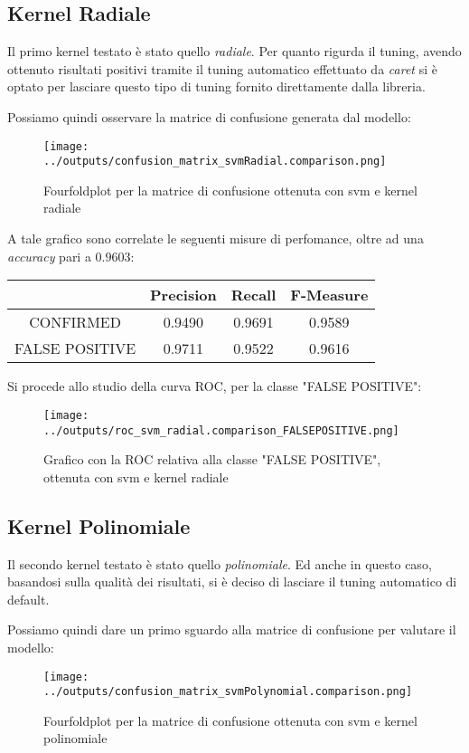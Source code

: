 \subsection{Kernel Radiale}
Il primo kernel testato è stato quello \textit{radiale}.
Per quanto rigurda il tuning, avendo ottenuto risultati positivi tramite il tuning automatico
effettuato da \textit{caret} si è optato per lasciare questo tipo di tuning fornito 
direttamente dalla libreria.

Possiamo quindi osservare la matrice di confusione generata dal modello:
\begin{figure}[H]
    \centering
    \texttt{[image: ../outputs/confusion\_matrix\_svmRadial.comparison.png]}
    \caption{Fourfoldplot per la matrice di confusione ottenuta con svm e kernel radiale}
\end{figure}
A tale grafico sono correlate le seguenti misure di perfomance, oltre ad una 
\textit{accuracy} pari a $0.9603$:
\begin{center}
    \begin{tabular}{| c | c c c |} 
    \hline
    & Precision & Recall & F-Measure \\ [0.5ex] 
    \hline\hline
    CONFIRMED & 0.9490 & 0.9691 & 0.9589 \\ 
    \hline
    FALSE POSITIVE & 0.9711 & 0.9522 & 0.9616 \\ 
    \hline
    \end{tabular}
\end{center}
Si procede allo studio della curva ROC, per la classe "FALSE POSITIVE":
\begin{figure}[H]
    \centering
    \texttt{[image: ../outputs/roc\_svm\_radial.comparison\_FALSEPOSITIVE.png]}
    \caption{Grafico con la ROC relativa alla classe "FALSE POSITIVE", ottenuta con svm e kernel radiale}
\end{figure}
\subsection{Kernel Polinomiale}
Il secondo kernel testato è stato quello \textit{polinomiale}.
Ed anche in questo caso, basandosi sulla qualità dei risultati, si è deciso di
lasciare il tuning automatico di default.

Possiamo quindi dare un primo sguardo alla matrice di confusione per valutare il modello:
\begin{figure}[H]
    \centering
    \texttt{[image: ../outputs/confusion\_matrix\_svmPolynomial.comparison.png]}
    \caption{Fourfoldplot per la matrice di confusione ottenuta con svm e kernel polinomiale}
\end{figure}

